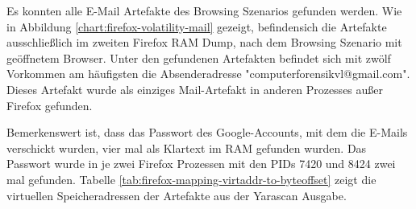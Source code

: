 Es konnten alle E-Mail Artefakte des Browsing Szenarios gefunden werden.
Wie in Abbildung \ref{chart:firefox-volatility-mail} gezeigt, befindensich die Artefakte ausschließlich im zweiten Firefox RAM Dump, nach dem Browsing Szenario mit geöffnetem Browser.
Unter den gefundenen Artefakten befindet sich mit zwölf Vorkommen am häufigsten die Absenderadresse "computerforensikvl@gmail.com". Dieses Artefakt wurde als einziges Mail-Artefakt in anderen Prozesses außer Firefox gefunden.

Bemerkenswert ist, dass das Passwort des Google-Accounts, mit dem die E-Mails verschickt wurden, vier mal als Klartext im RAM gefunden wurden. Das Passwort wurde in je zwei Firefox Prozessen mit den PIDs 7420 und 8424 zwei mal gefunden. Tabelle \ref{tab:firefox-mapping-virtaddr-to-byteoffset} zeigt die virtuellen Speicheradressen der Artefakte aus der Yarascan Ausgabe.
\begin{table}[]
\label{tab:firefox-mapping-virtaddr-to-byteoffset}
\caption{Abbildung der virtellen Speicheradressen der gefundenen Strings auf Byte-Offsets der entsprechenden Speicherseiten}
\end{table}

